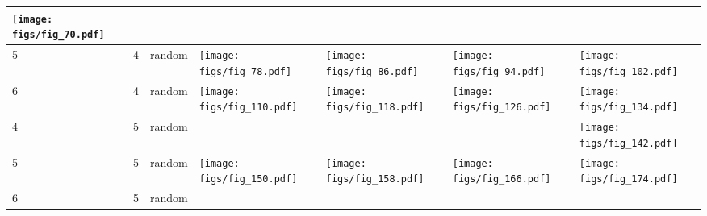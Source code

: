 \documentclass[oneside,canadian,landscape]{article}
\begin{document}
\begin{center}
\begin{longtable}{|l|l|l||l|l|l|l|}
\begin{minipage}{3.5cm}
\texttt{[image: figs/fig\_70.pdf]}
\end{minipage}
&\\ \hline
5&4&random&\begin{minipage}{3.5cm}
\texttt{[image: figs/fig\_78.pdf]}
\end{minipage}
&\begin{minipage}{3.5cm}
\texttt{[image: figs/fig\_86.pdf]}
\end{minipage}
&\begin{minipage}{3.5cm}
\texttt{[image: figs/fig\_94.pdf]}
\end{minipage}
&\begin{minipage}{3.5cm}
\texttt{[image: figs/fig\_102.pdf]}
\end{minipage}
\\ \hline
6&4&random&\begin{minipage}{3.5cm}
\texttt{[image: figs/fig\_110.pdf]}
\end{minipage}
&\begin{minipage}{3.5cm}
\texttt{[image: figs/fig\_118.pdf]}
\end{minipage}
&\begin{minipage}{3.5cm}
\texttt{[image: figs/fig\_126.pdf]}
\end{minipage}
&\begin{minipage}{3.5cm}
\texttt{[image: figs/fig\_134.pdf]}
\end{minipage}
\\ \hline
4&5&random&&&&\begin{minipage}{3.5cm}
\texttt{[image: figs/fig\_142.pdf]}
\end{minipage}
\\ \hline
5&5&random&\begin{minipage}{3.5cm}
\texttt{[image: figs/fig\_150.pdf]}
\end{minipage}
&\begin{minipage}{3.5cm}
\texttt{[image: figs/fig\_158.pdf]}
\end{minipage}
&\begin{minipage}{3.5cm}
\texttt{[image: figs/fig\_166.pdf]}
\end{minipage}
&\begin{minipage}{3.5cm}
\texttt{[image: figs/fig\_174.pdf]}
\end{minipage}
\\ \hline
6&5&random&&\begin{minipage}{3.5cm}

\end{minipage}
\end{longtable}
\end{center}
\end{document}
